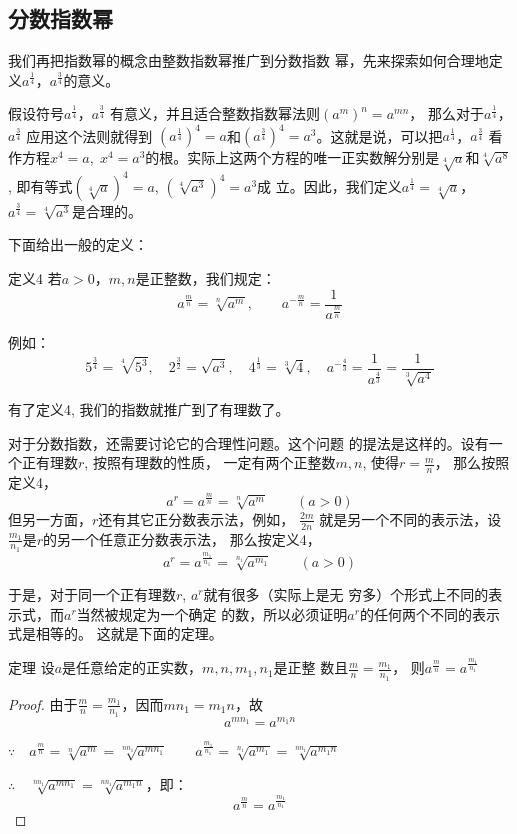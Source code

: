 \subsection{分数指数幂}
我们再把指数幂的概念由整数指数幂推广到分数指数
幂，先来探索如何合理地定义$a^{\tfrac{1}{4}}$，$a^{\tfrac{3}{4}}$的意义。

假设符号$a^{\tfrac{1}{4}}$，$a^{\tfrac{3}{4}}$
有意义，并且适合整数指数幂法则$(a^m)^n=a^{mn}$，
那么对于$a^{\tfrac{1}{4}}$，$a^{\tfrac{3}{4}}$
应用这个法则就得到
$\left(a^{\tfrac{1}{4}}\right)^4=a$和$\left(a^{\tfrac{3}{4}}\right)^4=a^3$。这就是说，可以把$a^{\tfrac{1}{4}}$，$a^{\tfrac{3}{4}}$
看作方程$x^4=a,\; x^4=a^3$的根。实际上这两个方程的唯一正实数解分别是$\sqrt[4]{a}$和$\sqrt[4]{a^8}$, 即有等式$\left(\sqrt[4]{a}\right)^4=a$, $\left(\sqrt[4]{a^3}\right)^4=a^3$成
立。因此，我们定义$a^{\tfrac{1}{4}}=\sqrt[4]{a}$，$a^{\tfrac{3}{4}}=\sqrt[4]{a^3}$是合理的。

下面给出一般的定义：
\begin{blk}{定义4}
若$a>0$，$m,n$是正整数，我们规定：
 \[a^{\tfrac{m}{n}}=\sqrt[n]{a^m},\qquad a^{-\tfrac{m}{n}}=\frac{1}{a^{\tfrac{m}{n}}}\]
\end{blk}

例如：
\[5^{\tfrac{3}{4}}=\sqrt[4]{5^3},\quad 2^{\tfrac{3}{2}}=\sqrt{a^3},\quad 4^{\tfrac{1}{3}}=\sqrt[3]{4},\quad a^{-\tfrac{4}{3}}=\frac{1}{a^{\tfrac{4}{3}}}=\frac{1}{\sqrt[3]{a^4}} \]

有了定义4, 我们的指数就推广到了有理数了。

对于分数指数，还需要讨论它的合理性问题。这个问题
的提法是这样的。设有一个正有理数$r$, 按照有理数的性质，
一定有两个正整数$m,n$, 使得$r=\frac{m}{n}$，
那么按照定义4，
\[a^r=a^{\tfrac{m}{n}}=\sqrt[n]{a^m}\qquad (a>0)\]
但另一方面，$r$还有其它正分数表示法，例如，
$\frac{2m}{2n}$
就是另一个不同的表示法，设
$\frac{m_1}{n_1}$是$r$的另一个任意正分数表示法，
那么按定义4，
\[a^r=a^{\tfrac{m_1}{n_1}}=\sqrt[n_1]{a^{m_1}}\qquad (a>0)\]

于是，对于同一个正有理数$r$, $a^r$就有很多（实际上是无
穷多）个形式上不同的表示式，而$a^r$当然被规定为一个确定
的数，所以必须证明$a^r$的任何两个不同的表示式是相等的。
这就是下面的定理。

\begin{blk}{定理}
    设$a$是任意给定的正实数，$m,n,m_1,n_1$是正整
    数且$\frac{m}{n}=\frac{m_1}{n_1}$，
    则$a^{\tfrac{m}{n}}=a^{\tfrac{m_1}{n_1}}$   
\end{blk}

\begin{proof}
由于$\frac{m}{n}=\frac{m_1}{n_1}$，因而$mn_1=m_1n$，故
\[a^{mn_1}=a^{m_1n}\]

$\because\quad a^{\tfrac{m}{n}}=\sqrt[n]{a^m}=\sqrt[nn_1]{a^{mn_1}}\qquad 
a^{\tfrac{m_1}{n_1}}=\sqrt[n_1]{a^{m_1}}=\sqrt[nn_1]{a^{m_1n}}$

$\therefore\quad \sqrt[nn_1]{a^{mn_1}}=\sqrt[nn_1]{a^{m_1n}}$，即：
\[a^{\tfrac{m}{n}}=a^{\tfrac{m_1}{n_1}}\]
\end{proof}
    
